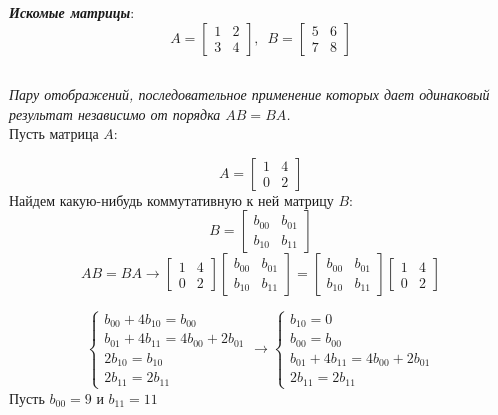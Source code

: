 \documentclass[a5paper, 10pt]{article}
\theoremstyle{definition}
\theoremstyle{plain}
\theoremstyle{remark}
\begin{document}
\textit{\textbf{Искомые матрицы}}:
\begin{equation}
A=
\begin{bmatrix}
1 & 2\\
3 & 4
\end{bmatrix}
, \, \, \, 
B=
\begin{bmatrix}
5 & 6\\
7 & 8
\end{bmatrix}
\end{equation}

\newpage
\subsection{}
\textit{Пару отображений, последовательное применение которых дает одинаковый результат независимо от порядка $AB = BA$.}\\
Пусть матрица $A$:

\begin{equation}
A=
\begin{bmatrix}
1 & 4\\
0 & 2
\end{bmatrix}
\end{equation}
Найдем какую-нибудь коммутативную к ней матрицу $B$:
\begin{equation}
B=
\begin{bmatrix}
b_{0 0} & b_{0 1}\\
b_{1 0} & b_{1 1}
\end{bmatrix}
\end{equation}
\begin{equation}
AB= BA \to
\begin{bmatrix}
1 & 4\\
0 & 2
\end{bmatrix}
\begin{bmatrix}
b_{0 0} & b_{0 1}\\
b_{1 0} & b_{1 1}
\end{bmatrix}
=
\begin{bmatrix}
b_{0 0} & b_{0 1}\\
b_{1 0} & b_{1 1}
\end{bmatrix}
\begin{bmatrix}
1 & 4\\
0 & 2
\end{bmatrix}
\end{equation}

\begin{equation}
\begin{cases}
b_{0 0} + 4b_{1 0} = b_{0 0}\\
b_{0 1} + 4 b_{1 1} = 4b_{0 0} + 2b_{0 1}\\
2b_{1 0} = b_{1 0}\\
2 b_{1 1} = 2b_{1 1}
\end{cases}
\to
\begin{cases}
b_{1 0} = 0\\
b_{0 0} = b_{0 0}\\
b_{0 1} + 4 b_{1 1} = 4b_{0 0} + 2b_{0 1}\\
2 b_{1 1} = 2b_{1 1}
\end{cases}
\end{equation}
Пусть $b_{0 0} = 9$ и $b_{1 1} = 11$
\end{document}
